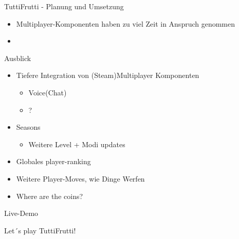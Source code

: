 \documentclass[xcolor=dvipsnames]{beamer}
\begin{document}
\begin{frame}{TuttiFrutti - Planung und Umsetzung}
\begin{itemize}
	\item Multiplayer-Komponenten haben zu viel Zeit in Anspruch genommen 
	\item 
\end{itemize}
\end{frame}

\begin{frame}{Ausblick}
\begin{itemize}
 		\item Tiefere Integration von (Steam)Multiplayer Komponenten
 			\begin{itemize}
 				\item Voice(Chat)
 				\item ?
 			\end{itemize}
 		\item Seasons
 			\begin{itemize}
	 			\item Weitere Level + Modi updates
 			\end{itemize}
 		\item Globales player-ranking
 		\item Weitere Player-Moves, wie Dinge Werfen
 		\item Where are the coins?
\end{itemize}

\end{frame}

\begin{frame}{Live-Demo}

\begin{center}
	\Huge{\textcolor{OliveGreen}{Let´s play TuttiFrutti!}}
\end{center}

\end{frame}
\end{document}
